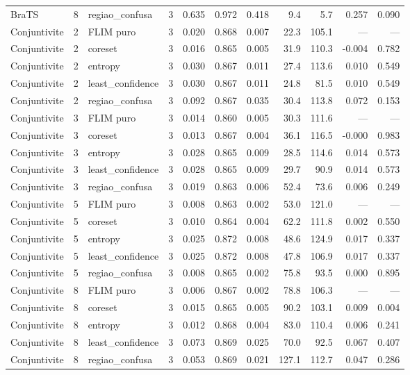 \begin{tabular}{lllrrrrrrrr}
BraTS & 8 & regiao\_confusa & 3 & 0.635 & 0.972 & 0.418 & 9.4 & 5.7 & 0.257 & 0.090 \\
Conjuntivite & 2 & FLIM puro & 3 & 0.020 & 0.868 & 0.007 & 22.3 & 105.1 & — & — \\
Conjuntivite & 2 & coreset & 3 & 0.016 & 0.865 & 0.005 & 31.9 & 110.3 & -0.004 & 0.782 \\
Conjuntivite & 2 & entropy & 3 & 0.030 & 0.867 & 0.011 & 27.4 & 113.6 & 0.010 & 0.549 \\
Conjuntivite & 2 & least\_confidence & 3 & 0.030 & 0.867 & 0.011 & 24.8 & 81.5 & 0.010 & 0.549 \\
Conjuntivite & 2 & regiao\_confusa & 3 & 0.092 & 0.867 & 0.035 & 30.4 & 113.8 & 0.072 & 0.153 \\
Conjuntivite & 3 & FLIM puro & 3 & 0.014 & 0.860 & 0.005 & 30.3 & 111.6 & — & — \\
Conjuntivite & 3 & coreset & 3 & 0.013 & 0.867 & 0.004 & 36.1 & 116.5 & -0.000 & 0.983 \\
Conjuntivite & 3 & entropy & 3 & 0.028 & 0.865 & 0.009 & 28.5 & 114.6 & 0.014 & 0.573 \\
Conjuntivite & 3 & least\_confidence & 3 & 0.028 & 0.865 & 0.009 & 29.7 & 90.9 & 0.014 & 0.573 \\
Conjuntivite & 3 & regiao\_confusa & 3 & 0.019 & 0.863 & 0.006 & 52.4 & 73.6 & 0.006 & 0.249 \\
Conjuntivite & 5 & FLIM puro & 3 & 0.008 & 0.863 & 0.002 & 53.0 & 121.0 & — & — \\
Conjuntivite & 5 & coreset & 3 & 0.010 & 0.864 & 0.004 & 62.2 & 111.8 & 0.002 & 0.550 \\
Conjuntivite & 5 & entropy & 3 & 0.025 & 0.872 & 0.008 & 48.6 & 124.9 & 0.017 & 0.337 \\
Conjuntivite & 5 & least\_confidence & 3 & 0.025 & 0.872 & 0.008 & 47.8 & 106.9 & 0.017 & 0.337 \\
Conjuntivite & 5 & regiao\_confusa & 3 & 0.008 & 0.865 & 0.002 & 75.8 & 93.5 & 0.000 & 0.895 \\
Conjuntivite & 8 & FLIM puro & 3 & 0.006 & 0.867 & 0.002 & 78.8 & 106.3 & — & — \\
Conjuntivite & 8 & coreset & 3 & 0.015 & 0.865 & 0.005 & 90.2 & 103.1 & 0.009 & 0.004 \\
Conjuntivite & 8 & entropy & 3 & 0.012 & 0.868 & 0.004 & 83.0 & 110.4 & 0.006 & 0.241 \\
Conjuntivite & 8 & least\_confidence & 3 & 0.073 & 0.869 & 0.025 & 70.0 & 92.5 & 0.067 & 0.407 \\
Conjuntivite & 8 & regiao\_confusa & 3 & 0.053 & 0.869 & 0.021 & 127.1 & 112.7 & 0.047 & 0.286 \\
\hline
\end{tabular}
